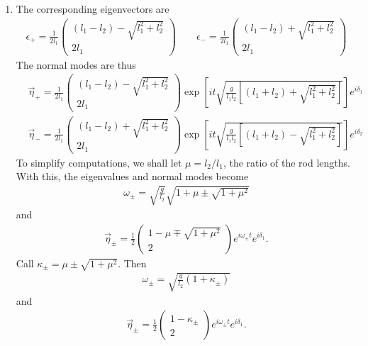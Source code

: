 \documentclass{article}
\theoremstyle{definition}
\newcommand{\f}[2]{\frac{#1}{#2}}
\newcommand{\lb}{\left[}
\newcommand{\rb}{\right]}
\begin{document}
\begin{enumerate}[label=(\alph*)]
	\item The corresponding eigenvectors are
	\begin{align*}
	\boxed{\epsilon_+ = \f{1}{2l_1}\begin{pmatrix}
	 (l_1-l_2) - \sqrt{l_1^2 + l_2^2}  \\ 2l_1
	\end{pmatrix} 
	\quad\quad 
	\epsilon_- = \f{1}{2l_1}\begin{pmatrix}
	(l_1-l_2) + \sqrt{l_1^2 + l_2^2}  \\ 2l_1
	\end{pmatrix}} 
	\end{align*}
	The normal modes are thus
	\begin{align*}
	&\boxed{\vec{\eta}_+ = \f{1}{2l_1}\begin{pmatrix}
	(l_1-l_2) - \sqrt{l_1^2 + l_2^2}  \\ 2l_1
	\end{pmatrix} \exp\lb it\sqrt{\f{g}{l_1l_2} \lb (l_1+l_2) + \sqrt{l_1^2 + l_2^2} \rb}\rb e^{i\delta_1}}\\
	&\boxed{\vec{\eta}_- = \f{1}{2l_1}\begin{pmatrix}
	(l_1-l_2) + \sqrt{l_1^2 + l_2^2}  \\ 2l_1
	\end{pmatrix} \exp\lb it\sqrt{\f{g}{l_1l_2} \lb (l_1+l_2) - \sqrt{l_1^2 + l_2^2} \rb}\rb e^{i\delta_2}}
	\end{align*}
	To simplify computations, we shall let $\mu = l_2/l_1$, the ratio of the rod lengths. With this, the eigenvalues and normal modes become 
	\begin{align*}
	\omega_\pm = \sqrt{\f{g}{l_2}} \sqrt{ 1 + \mu \pm \sqrt{1+\mu^2}}
	\end{align*}
	and
	\begin{align*}
	\vec{\eta}_\pm = \f{1}{2}\begin{pmatrix}
	1-\mu \mp \sqrt{1+\mu^2} \\ 2 
	\end{pmatrix}  e^{i\omega_\pm t} e^{i\delta_1}.
	\end{align*}
	Call $\kappa_\pm = \mu \pm \sqrt{1+\mu^2}$. Then 
	\begin{align*}
	\omega_\pm = \sqrt{\f{g}{l_2} ( 1 + \kappa_\pm) }
	\end{align*}
	and
	\begin{align*}
	\vec{\eta}_\pm = \f{1}{2}\begin{pmatrix}
	1-\kappa_\pm \\ 2 
	\end{pmatrix}  e^{i\omega_\pm t} e^{i\delta_1}.
	\end{align*}
	

\end{enumerate}
\end{document}
